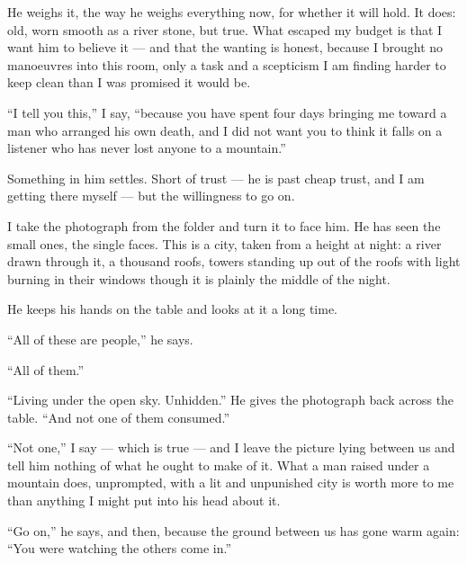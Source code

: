 He weighs it, the way he weighs everything now, for whether it will hold. It does: old, worn smooth as a river stone, but true. What escaped my budget is that I want him to believe it --- and that the wanting is honest, because I brought no manoeuvres into this room, only a task and a scepticism I am finding harder to keep clean than I was promised it would be.\par

``I tell you this,'' I say, ``because you have spent four days bringing me toward a man who arranged his own death, and I did not want you to think it falls on a listener who has never lost anyone to a mountain.''\par

Something in him settles. Short of trust --- he is past cheap trust, and I am getting there myself --- but the willingness to go on.\par

I take the photograph from the folder and turn it to face him. He has seen the small ones, the single faces. This is a city, taken from a height at night: a river drawn through it, a thousand roofs, towers standing up out of the roofs with light burning in their windows though it is plainly the middle of the night.\par

He keeps his hands on the table and looks at it a long time.\par

``All of these are people,'' he says.\par

``All of them.''\par

``Living under the open sky. Unhidden.'' He gives the photograph back across the table. ``And not one of them consumed.''\par

``Not one,'' I say --- which is true --- and I leave the picture lying between us and tell him nothing of what he ought to make of it. What a man raised under a mountain does, unprompted, with a lit and unpunished city is worth more to me than anything I might put into his head about it.\par

``Go on,'' he says, and then, because the ground between us has gone warm again: ``You were watching the others come in.''\par

\ornament


